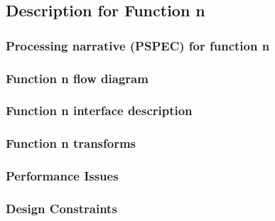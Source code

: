 \documentclass{article}
\begin{document}
\subsection{Description for Function n}

\subsubsection{Processing narrative (PSPEC) for function n}

\subsubsection{Function n flow diagram}

\subsubsection{Function n interface description}

\subsubsection{Function n transforms}





\subsubsection{Performance Issues}

\subsubsection{Design Constraints}
\end{document}
